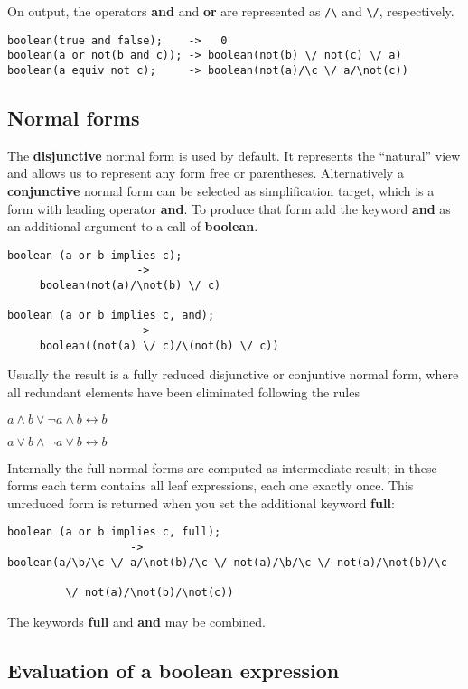 On output, the
operators {\bf and} and {\bf or} are represented as
\verb+/\+ and \verb+\/+, respectively.
\begin{verbatim}
boolean(true and false);    ->   0
boolean(a or not(b and c)); -> boolean(not(b) \/ not(c) \/ a)
boolean(a equiv not c);     -> boolean(not(a)/\c \/ a/\not(c))
\end{verbatim}

\subsection{Normal forms}

The {\bf disjunctive} normal form is used by default. It
represents the ``natural'' view and allows us to represent
any form free or parentheses.
Alternatively a {\bf conjunctive} normal form can be
selected as simplification target, which is a form with
leading operator {\bf and}. To produce that form add the keyword  {\bf and}
as an additional argument to a call of {\bf boolean}.
\begin{verbatim}
boolean (a or b implies c); 
                    -> 
     boolean(not(a)/\not(b) \/ c)

boolean (a or b implies c, and); 
                    ->
     boolean((not(a) \/ c)/\(not(b) \/ c))
\end{verbatim}

Usually the result is a fully reduced disjunctive or conjuntive normal
form, where all redundant elements have been eliminated following the
rules

$ a \wedge b \vee \neg a \wedge b \longleftrightarrow b$

$ a \vee b \wedge \neg a \vee b \longleftrightarrow b$
 

Internally the full normal forms are computed
as intermediate result; in these forms each term contains
all leaf expressions, each one exactly once. This unreduced form is returned 
when you set the additional keyword {\bf full}:
\begin{verbatim}
boolean (a or b implies c, full);
                   ->
boolean(a/\b/\c \/ a/\not(b)/\c \/ not(a)/\b/\c \/ not(a)/\not(b)/\c

         \/ not(a)/\not(b)/\not(c))
\end{verbatim}

The keywords {\bf full} and {\bf and} may be combined.

\subsection{Evaluation of a boolean expression}

